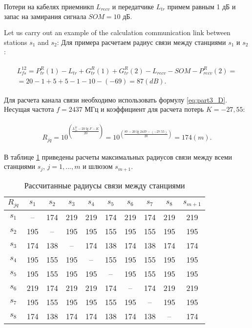 Потери на кабелях приемникп $ L_{recv} $ и передатчике $ L_{tr} $ примем равным 1 дБ и запас на замирания сигнала $ SOM = 10 $ дБ.

Let us carry out an example of the calculation communication link between stations $ s_1 $ and $ s_2 $:
Для примера расчетаем радиус связи между станциями $ s_1 $ и $ s_2 $:

\begin{align}
  \begin{aligned}
  L_{fs}^{12} = P_{tr}^R(1) - L_{tr} + G_{tr}^R(1) + G_{tr}^R(2) - L_{recv} - SOM - P_{recv}^R(2)= \\
  = 20 - 1 + 5 + 5 - 1 - 10 - (-69) = 87 (dB).
  \end{aligned}
\end{align}

Для расчета канала связи необходимо использовать формулу \cref{eq:part3_D}. Несущая частота $ f = 2437 $ МГц и коэффициент для расчета потерь $ K = -27,55 $:

\begin{align}
  \begin{aligned}
  R_{jq} = 10^{\left(\frac{L_{fs}^{jq} - 20\lg{F} - K}{20}\right)}
  = 10^{\left(\frac{87 - 20\lg{2437} - (-27.55)}{20}\right)} = 174 (m).
  \end{aligned}
\end{align}

В таблице \cref{tab:part3_Rjq} приведены расчеты максимальных радиусов связи между всеми станциями $ s_j $, $ j = 1, ..., m $ и шлюзом $ s_ {m + 1} $.

\begin{table}[h!]\centering
  \begin{tabular}{|c||c|c|c|c|c|c|c|c|c|}\hline
      $R_{jq}$ & $s_1$ & $s_2$ & $s_3$ & $s_4$ & $s_5$ & $s_6$ & $s_7$ & $s_8$ & $s_{m+1}$ \\ \hline \hline

      $s_1$ &--& 174& 219& 219& 174& 219& 174& 219& 219\\ 
      $s_2$ &195& --& 195& 195& 155& 195& 155& 195& 195\\ 
      $s_3$ &174& 138& --& 174& 138& 174& 138& 174& 174\\ 
      $s_4$ &195& 155& 195& --& 155& 195& 155& 195& 195\\ 
      $s_5$ &195& 155& 195& 195& --& 195& 155& 195& 195\\ 
      $s_6$ &219& 174& 219& 219& 174& --& 174& 219& 219\\
      $s_7$ &195& 155& 195& 195& 155& 195& --& 195& 195\\ 
      $s_8$ &174& 138& 174& 174& 138& 174& 138& --& 174\\ 
      \hline

\end{tabular}\caption{Рассчитанные радиусы связи между станциями}\label{tab:part3_Rjq}
\end{table}

